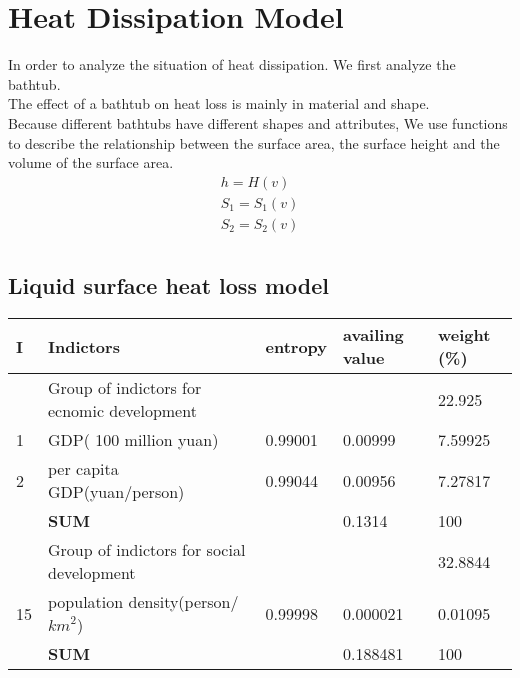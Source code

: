 \documentclass{mcmthesis}
\begin{document}
\section{Heat Dissipation Model}
In order to analyze the situation of heat dissipation. 
We first analyze the bathtub.\\
\indent The effect of a bathtub on heat loss is mainly in material and shape.\\
Because different bathtubs have different shapes and attributes, We use functions to describe the relationship between the surface area, the surface height and the volume of the surface area.
\begin{equation}
\begin{split}
h=H(v)  \\
S_{1}=S_{1}(v) \\
S_{2}=S_{2}(v)  \\
\end{split}
\end{equation}


\subsection{Liquid surface heat loss model}%

\begin{table}
\setlength{\abovecaptionskip}{0pt}
\setlength{\belowcaptionskip}{0pt}
\centering
{}
\begin{tabular}{p{0.4cm}|p{9cm}|p{1.5cm}|p{1.5cm}|p{1.7cm}}
\hline
\bf I	& {\bf Indictors}			 &  \bf entropy		& \bf availing value		& \bf weight (\%) \\	
\hline
\rowcolor[gray]{0.9}	& Group of indictors for ecnomic development			& 		& 		& 22.925 \\	
\hline
 1		& GDP( 100 million yuan)		& 0.99001		& 0.00999		& 7.59925 \\	
2		& per capita GDP(yuan/person)		& 0.99044		& 0.00956		& 7.27817 \\	

	&\bf  SUM			& 		& 0.1314		& 100 \\	
\hline
\rowcolor[gray]{0.9}	& Group of indictors for social development			& 		& 		& 32.8844 \\	
\hline
15		& population density(person/${km}^2$)		& 0.99998		& 0.000021		& 0.01095 \\	

	& \bf SUM			& 		& 0.188481		& 100 \\	
\hline
\hline
\end{tabular}
\end{table}
\end{document}
